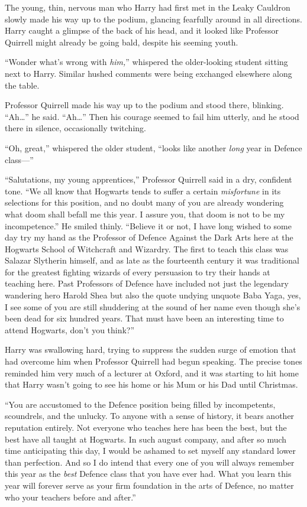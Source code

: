 The young, thin, nervous man who Harry had first met in the Leaky Cauldron slowly made his way up to the podium, glancing fearfully around in all directions. Harry caught a glimpse of the back of his head, and it looked like Professor Quirrell might already be going bald, despite his seeming youth.

“Wonder what’s wrong with \emph{him,}” whispered the older-looking student sitting next to Harry. Similar hushed comments were being exchanged elsewhere along the table.

Professor Quirrell made his way up to the podium and stood there, blinking. “Ah…” he said. “Ah…” Then his courage seemed to fail him utterly, and he stood there in silence, occasionally twitching.

“Oh, great,” whispered the older student, “looks like another \emph{long} year in Defence class—”

“Salutations, my young apprentices,” Professor Quirrell said in a dry, confident tone. “We all know that Hogwarts tends to suffer a certain \emph{misfortune} in its selections for this position, and no doubt many of you are already wondering what doom shall befall me this year. I assure you, that doom is not to be my incompetence.” He smiled thinly. “Believe it or not, I have long wished to some day try my hand as the Professor of Defence Against the Dark Arts here at the Hogwarts School of Witchcraft and Wizardry. The first to teach this class was Salazar Slytherin himself, and as late as the fourteenth century it was traditional for the greatest fighting wizards of every persuasion to try their hands at teaching here. Past Professors of Defence have included not just the legendary wandering hero Harold Shea but also the quote undying unquote Baba Yaga, yes, I see some of you are still shuddering at the sound of her name even though she’s been dead for six hundred years. That must have been an interesting time to attend Hogwarts, don’t you think?”

Harry was swallowing hard, trying to suppress the sudden surge of emotion that had overcome him when Professor Quirrell had begun speaking. The precise tones reminded him very much of a lecturer at Oxford, and it was starting to hit home that Harry wasn’t going to see his home or his Mum or his Dad until Christmas.

“You are accustomed to the Defence position being filled by incompetents, scoundrels, and the unlucky. To anyone with a sense of history, it bears another reputation entirely. Not everyone who teaches here has been the best, but the best have all taught at Hogwarts. In such august company, and after so much time anticipating this day, I would be ashamed to set myself any standard lower than perfection. And so I do intend that every one of you will always remember this year as the \emph{best} Defence class that you have ever had. What you learn this year will forever serve as your firm foundation in the arts of Defence, no matter who your teachers before and after.”

